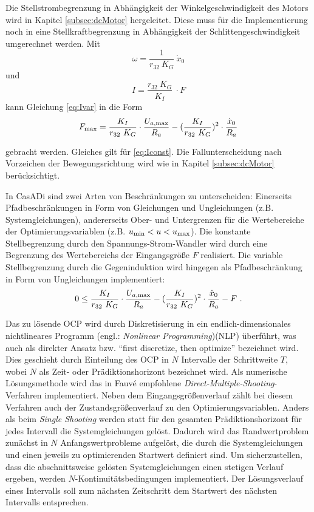 Die Stellstrombegrenzung in Abhängigkeit der Winkelgeschwindigkeit des Motors wird in Kapitel \ref{subsec:dcMotor} hergeleitet. Diese muss für die Implementierung noch in eine Stellkraftbegrenzung in Abhängigkeit der Schlittengeschwindigkeit umgerechnet werden.
Mit 
	\[
	\omega = \frac{1}{r_{32}\ K_G} \ \dot{x}_0 
\]
und 
	\[
	I = \frac{r_{32}\ K_G}{K_I} \ \cdot F
\]
kann Gleichung \eqref{eq:Ivar} in die Form
	\[
	F_{\mathrm{max}} = \frac{K_I}{r_{32}\ K_G} \cdot \frac{U_{a\mathrm{,max}}}{R_a} - (\frac{K_I}{r_{32}\ K_G})^2 \cdot \frac{\dot{x}_0}{R_a}
\]

gebracht werden. Gleiches gilt für \eqref{eq:Iconst}. Die Fallunterscheidung nach Vorzeichen der Bewegungsrichtung wird wie in Kapitel \ref{subsec:dcMotor} berücksichtigt. 

In CasADi sind zwei Arten von Beschränkungen zu unterscheiden: Einerseits Pfadbeschränkungen in Form von Gleichungen und Ungleichungen (z.B. Systemgleichungen), andererseits Ober- und Untergrenzen für die Wertebereiche der Optimierungsvariablen (z.B. $u_{\mathrm{min}}<u<u_{\mathrm{max}}$). Die konstante Stellbegrenzung durch den Spannungs-Strom-Wandler wird durch eine Begrenzung des Wertebereichs der Eingangsgröße $F$ realisiert. Die variable Stellbegrenzung durch die Gegeninduktion wird hingegen als Pfadbeschränkung in Form von Ungleichungen implementiert:
\[
	 0 \leq \frac{K_I}{r_{32}\ K_G} \cdot \frac{U_{a\mathrm{,max}}}{R_a} - (\frac{K_I}{r_{32}\ K_G})^2 \cdot \frac{\dot{x}_0}{R_a} - F \ .
\]

Das zu lösende OCP wird durch Diskretisierung in ein endlich-dimensionales nichtlineares Programm (engl.: \textit{Nonlinear Programming})(NLP) überführt, was auch als direkter Ansatz bzw. "`first discretize, then optimize"' bezeichnet wird. Dies geschieht durch Einteilung des OCP in $N$ Intervalle der Schrittweite $T$, wobei $N$ als Zeit- oder Prädiktionshorizont bezeichnet wird. Als numerische Lösungsmethode wird das in Fauvé \cite{fauve} empfohlene \textit{Direct-Multiple-Shooting}-Verfahren implementiert. Neben dem Eingangsgrößenverlauf zählt bei diesem Verfahren auch der Zustandsgrößenverlauf zu den Optimierungsvariablen. Anders als beim \textit{Single Shooting} werden statt für den gesamten Prädiktionshorizont für jedes Intervall die Systemgleichungen gelöst. Dadurch wird das Randwertproblem zunächst in $N$ Anfangswertprobleme aufgelöst, die durch die Systemgleichungen und einen jeweils zu optimierenden Startwert definiert sind. Um sicherzustellen, dass die abschnittsweise gelösten Systemgleichungen einen stetigen Verlauf ergeben, werden $N$-Kontinuitätsbedingungen implementiert. Der Lösungsverlauf eines Intervalls soll zum nächsten Zeitschritt dem Startwert des nächsten Intervalls entsprechen.

